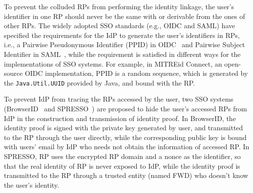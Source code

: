 
To prevent the colluded RPs from performing the identity linkage, the user's identifier in one RP should never be the same with or derivable from the ones of other RPs. The widely adopted SSO standards (e.g., OIDC and SAML) have specified the requirements for the IdP to generate the user's identifiers in RPs, i.e., a Pairwise Pseudonymous Identifier (PPID) in OIDC~\cite{OpenIDConnect} and Pairwise Subject Identifier in SAML~\cite{SAMLIdentifier}, while the requirement is satisfied in different ways for the implementations of SSO systems. For example, in MITREid Connect, an open-source OIDC implementation, PPID is a random sequence, which is generated by the \verb+Java.Util.UUID+ provided by Java, and bound with the RP.

To prevent IdP from tracing the RPs accessed by the user, two SSO systems (BrowserID~\cite{persona} and SPRESSO~\cite{SPRESSO}) are proposed to hide the user's accessed RPs from IdP in the construction and transmission of identity proof. In BrowserID, the identity proof is signed with the private key generated by user, and transmitted to the RP through the user directly,  while the corresponding  public key is bound with users' email by IdP who needs not obtain the information of accessed RP. In SPRESSO, RP uses the encrypted RP domain and a nonce as the identifier, so that the real identity of RP is never exposed to IdP, while the identity proof is transmitted to the RP through a trusted entity (named FWD) who doesn't know the user's identity.

